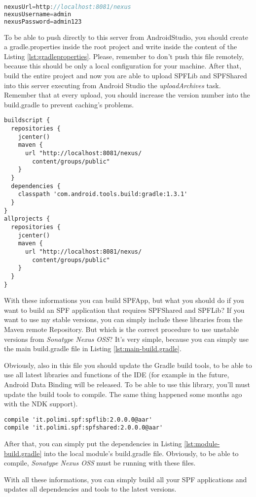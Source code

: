 \begin{lstlisting}[caption={gradle.properties},label=lst:gradleproperties, language=Java]
nexusUrl=http://localhost:8081/nexus
nexusUsername=admin
nexusPassword=admin123
\end{lstlisting}


To be able to push directly to this server from AndroidStudio, you should create a \textsf{gradle.properties} inside the root project and write inside the content of the Listing \ref{lst:gradleproperties}. Please, remember to don't push this file remotely, because this should be only a local configuration for your machine.
After that, build the entire project and now you are able to upload \textsf{SPFLib} and \textsf{SPFShared} into this server executing from Android Studio the \emph{uploadArchives} task. Remember that at every upload, you should increase the version number into the \textsf{build.gradle} to prevent caching's problems.

\begin{lstlisting}[caption={Main build.gradle},label=lst:main-build.gradle]
buildscript {
  repositories {
    jcenter()
    maven {
      url "http://localhost:8081/nexus/
      	content/groups/public"
    }
  }
  dependencies {
    classpath 'com.android.tools.build:gradle:1.3.1'
  }
}
allprojects {
  repositories {
    jcenter()
    maven {
      url "http://localhost:8081/nexus/
		content/groups/public"
    }
  }
}
\end{lstlisting}

With these informations you can build \textsf{SPFApp}, but what you should do if you want to build an SPF application that requires \textsf{SPFShared} and \textsf{SPFLib}?
If you want to use my stable versions, you can simply include these libraries from the Maven remote Repository. But which is the correct procedure to use unstable versions from \emph{Sonatype Nexus OSS}?
It's very simple, because you can simply use the main \textsf{build.gradle} file in Listing \ref{lst:main-build.gradle}.

Obviously, also in this file you should update the Gradle build tools, to be able to use all latest libraries and functions of the IDE (for example in the future, Android Data Binding will be released. To be able to use this library, you'll must update the build tools to compile. The same thing happened some months ago with the NDK support).

\begin{lstlisting}[caption={Module build.gradle's example},label=lst:module-build.gradle]
compile 'it.polimi.spf:spflib:2.0.0.0@aar'
compile 'it.polimi.spf:spfshared:2.0.0.0@aar'
\end{lstlisting}

After that, you can simply put the dependencies in Listing \ref{lst:module-build.gradle} into the local module's \textsf{build.gradle} file. Obviously, to be able to compile, \emph{Sonatype Nexus OSS} must be running with these files. 

With all these informations, you can simply build all your SPF applications and updates all dependencies and tools to the latest versions.



